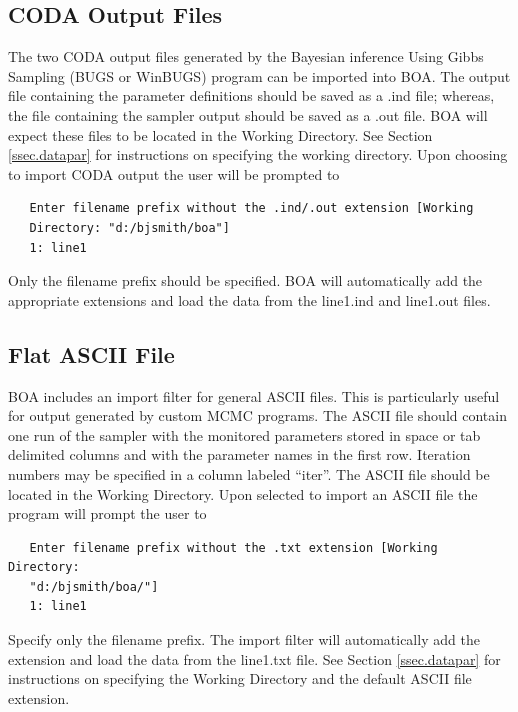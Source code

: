 \documentclass[12pt,letterpaper]{report}
\begin{document}
\subsection{CODA Output Files}
\noindent The two CODA output files generated by the Bayesian
inference Using Gibbs Sampling (BUGS or WinBUGS) program can be
imported into BOA. The output file containing the parameter
definitions should be saved as a .ind file; whereas, the file
containing the sampler output should be saved as a .out file. BOA
will expect these files to be located in the Working Directory.
See Section \ref{ssec.datapar} for instructions on specifying the
working directory. Upon choosing to import CODA output the user
will be prompted to
\vskip 9pt
\begin{tiny}
\begin{verbatim}
   Enter filename prefix without the .ind/.out extension [Working
   Directory: "d:/bjsmith/boa"]
   1: line1
\end{verbatim}
\end{tiny}
Only the filename prefix should be specified. BOA will automatically
add the appropriate extensions and load the data from the line1.ind
and line1.out files.

\subsection{Flat ASCII File}
\noindent BOA includes an import filter for general ASCII files.
This is particularly useful for output generated by custom MCMC
programs. The ASCII file should contain one run of the sampler
with the monitored parameters stored in space or tab delimited
columns and with the parameter names in the first row. Iteration
numbers may be specified in a column labeled ``iter''. The ASCII
file should be located in the Working Directory. Upon selected to
import an ASCII file the program will prompt the user to \vskip
9pt
\begin{tiny}
\begin{verbatim}
   Enter filename prefix without the .txt extension [Working Directory:
   "d:/bjsmith/boa/"]
   1: line1
\end{verbatim}
\end{tiny}
Specify only the filename prefix. The import filter will automatically add the
extension and load the data from the line1.txt file. See Section
\ref{ssec.datapar} for instructions on specifying the Working Directory and
the default ASCII file extension.
\end{document}

